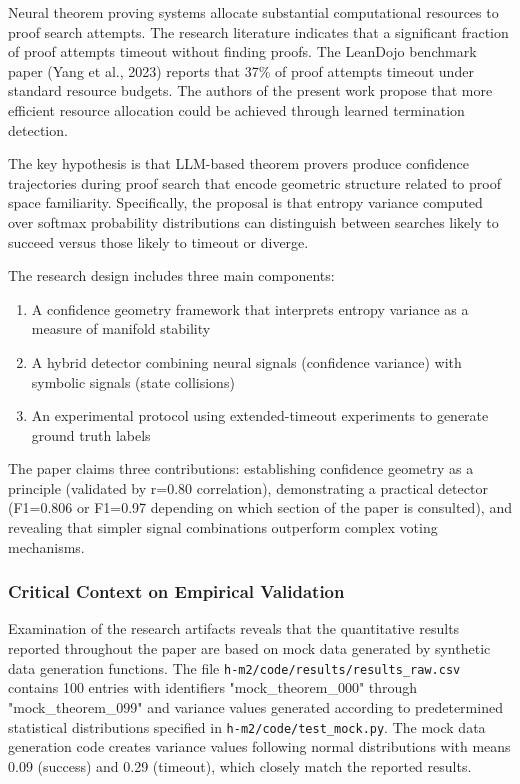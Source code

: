 
Neural theorem proving systems allocate substantial computational resources to proof search attempts. The research literature indicates that a significant fraction of proof attempts timeout without finding proofs. The LeanDojo benchmark paper (Yang et al., 2023) reports that 37\% of proof attempts timeout under standard resource budgets. The authors of the present work propose that more efficient resource allocation could be achieved through learned termination detection.

The key hypothesis is that LLM-based theorem provers produce confidence trajectories during proof search that encode geometric structure related to proof space familiarity. Specifically, the proposal is that entropy variance computed over softmax probability distributions can distinguish between searches likely to succeed versus those likely to timeout or diverge.

The research design includes three main components:

\begin{enumerate}
\item A confidence geometry framework that interprets entropy variance as a measure of manifold stability
\item A hybrid detector combining neural signals (confidence variance) with symbolic signals (state collisions)
\item An experimental protocol using extended-timeout experiments to generate ground truth labels
\end{enumerate}

The paper claims three contributions: establishing confidence geometry as a principle (validated by r=0.80 correlation), demonstrating a practical detector (F1=0.806 or F1=0.97 depending on which section of the paper is consulted), and revealing that simpler signal combinations outperform complex voting mechanisms.

\subsubsection{Critical Context on Empirical Validation}

Examination of the research artifacts reveals that the quantitative results reported throughout the paper are based on mock data generated by synthetic data generation functions. The file \texttt{h-m2/code/results/results_raw.csv} contains 100 entries with identifiers "mock_theorem_000" through "mock_theorem_099" and variance values generated according to predetermined statistical distributions specified in \texttt{h-m2/code/test_mock.py}. The mock data generation code creates variance values following normal distributions with means 0.09 (success) and 0.29 (timeout), which closely match the reported results.

